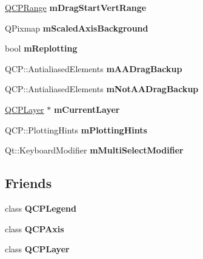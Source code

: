 \begin{DoxyCompactItemize}
\item 
\hypertarget{classQCustomPlot_a8af623ca768e25dacee6000703ffb5ff}{\hyperlink{classQCPRange}{Q\-C\-P\-Range} {\bfseries m\-Drag\-Start\-Vert\-Range}}\label{classQCustomPlot_a8af623ca768e25dacee6000703ffb5ff}

\item 
\hypertarget{classQCustomPlot_adce9d9f098c64cb88613186c03ee8489}{Q\-Pixmap {\bfseries m\-Scaled\-Axis\-Background}}\label{classQCustomPlot_adce9d9f098c64cb88613186c03ee8489}

\item 
\hypertarget{classQCustomPlot_ab30daeca6612c3948afd368dce5f1c39}{bool {\bfseries m\-Replotting}}\label{classQCustomPlot_ab30daeca6612c3948afd368dce5f1c39}

\item 
\hypertarget{classQCustomPlot_a460601989033fbf1ee0c71d4ac4a3736}{Q\-C\-P\-::\-Antialiased\-Elements {\bfseries m\-A\-A\-Drag\-Backup}}\label{classQCustomPlot_a460601989033fbf1ee0c71d4ac4a3736}

\item 
\hypertarget{classQCustomPlot_af7c775fa10bd940b4517b04ebf2b8b9d}{Q\-C\-P\-::\-Antialiased\-Elements {\bfseries m\-Not\-A\-A\-Drag\-Backup}}\label{classQCustomPlot_af7c775fa10bd940b4517b04ebf2b8b9d}

\item 
\hypertarget{classQCustomPlot_aa27569c92e74395af10151357d268628}{\hyperlink{classQCPLayer}{Q\-C\-P\-Layer} $\ast$ {\bfseries m\-Current\-Layer}}\label{classQCustomPlot_aa27569c92e74395af10151357d268628}

\item 
\hypertarget{classQCustomPlot_aa184197a6101a9cc5807469e1d006c9e}{Q\-C\-P\-::\-Plotting\-Hints {\bfseries m\-Plotting\-Hints}}\label{classQCustomPlot_aa184197a6101a9cc5807469e1d006c9e}

\item 
\hypertarget{classQCustomPlot_a0e97e701c5671e7e463d2ce0211d0f8a}{Qt\-::\-Keyboard\-Modifier {\bfseries m\-Multi\-Select\-Modifier}}\label{classQCustomPlot_a0e97e701c5671e7e463d2ce0211d0f8a}

\end{DoxyCompactItemize}
\subsection*{Friends}
\begin{DoxyCompactItemize}
\item 
\hypertarget{classQCustomPlot_a8429035e7adfbd7f05805a6530ad5e3b}{class {\bfseries Q\-C\-P\-Legend}}\label{classQCustomPlot_a8429035e7adfbd7f05805a6530ad5e3b}

\item 
\hypertarget{classQCustomPlot_af123edeca169ec7a31958a1d714e1a8a}{class {\bfseries Q\-C\-P\-Axis}}\label{classQCustomPlot_af123edeca169ec7a31958a1d714e1a8a}

\item 
\hypertarget{classQCustomPlot_a5dbf96bf7664c1b6fce49063eeea6eef}{class {\bfseries Q\-C\-P\-Layer}}\label{classQCustomPlot_a5dbf96bf7664c1b6fce49063eeea6eef}

\end{DoxyCompactItemize}


